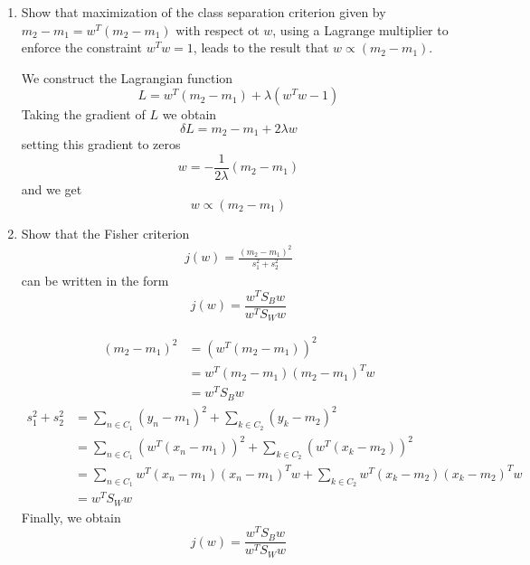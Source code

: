 \documentclass[a4paper]{article}
\begin{document}
	\courseheader
	\begin{enumerate}
		\setlength{\itemsep}{3\parskip}
		\item
		Show that maximization of the class separation criterion given by $m_2 - m_1 = w^T(m_2- m_1) $ with respect ot $w$, using a Lagrange multiplier to enforce the constraint $w^Tw = 1$, leads to the result that $w \propto (m_2 - m_1)$.
		\begin{solution}
			We construct the Lagrangian function
			\begin{equation*}
				L=w^T(m_2-m_1)+\lambda(w^Tw-1)
			\end{equation*}
			Taking the gradient of $L$ we obtain
			\begin{equation*}
				\delta L=m_2-m_1+2\lambda w
			\end{equation*}
			setting this gradient to zeros
			\begin{equation*}
				w=-\frac{1}{2\lambda}(m_2-m_1)
			\end{equation*}
			and we get
			\begin{equation*}
				w \propto (m_2-m_1)
			\end{equation*}
		\end{solution}
		\item
		Show that the Fisher criterion
		\begin{equation*}
			\begin{aligned}
				j(w) = \frac{(m_2 - m_1)^2}{s_1^2 + s_2^2}
			\end{aligned}
		\end{equation*}
		can be written in the form
		\begin{equation*}
			j(w) = \frac{w^TS_Bw}{w^TS_Ww}
		\end{equation*}
		\begin{solution}
			\begin{equation*}
				\begin{aligned}
				(m_2-m_1)^2 &=(w^T(m_2-m_1))^2\\
				&=w^T(m_2-m_1)(m_2-m_1)^Tw\\
				&=w^TS_Bw
				\end{aligned}
			\end{equation*}
			\begin{equation*}
				\begin{aligned}
				s_1^2 + s_2 ^2&= \sum_{n \in C_1}(y_n - m_1)^2 + \sum_{k \in C_2}(y_k - m_2)^2\\
				&=\sum_{n \in C_1}(w^T(x_n - m_1))^2 + \sum_{k \in C_2}(w^T(x_k - m_2))^2\\
				&=\sum_{n \in C_1}w^T(x_n - m_1)(x_n - m_1)^Tw+\sum_{k \in C_2}w^T(x_k - m_2)(x_k - m_2)^Tw\\
				&=w^TS_Ww
				\end{aligned}
			\end{equation*}
			Finally, we obtain
			\begin{equation*}
				j(w) = \frac{w^TS_Bw}{w^TS_Ww}
			\end{equation*}
		\end{solution}
		

\end{enumerate}
\end{document}
